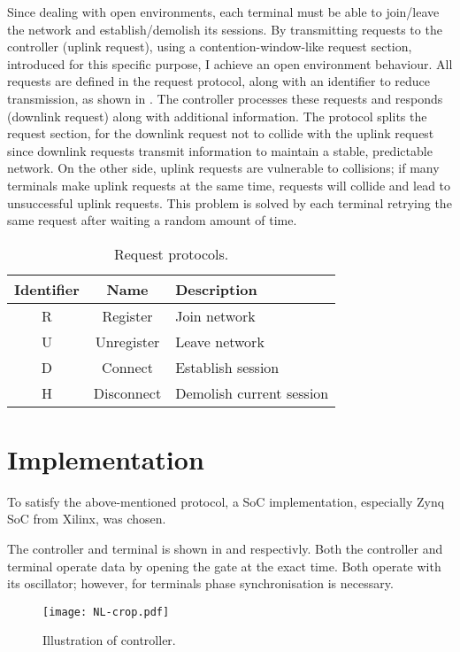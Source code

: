 ﻿\documentclass[twocolumn,9pt]{ltjsarticle}
\renewcommand{\ref}{\Cref}
\begin{document}
Since dealing with open environments, each terminal must be able to join/leave the network and establish/demolish its sessions.
By transmitting requests to the controller (uplink request), using a contention-window-like request section, introduced for this specific purpose, I achieve an open environment behaviour.
All requests are defined in the request protocol, along with an identifier to reduce transmission, as shown in \ref{tab:request}.
The controller processes these requests and responds (downlink request) along with additional information.
The protocol splits the request section, for the downlink request not to collide with the uplink request since downlink requests transmit information to maintain a stable, predictable network.
On the other side, uplink requests are vulnerable to collisions; if many terminals make uplink requests at the same time, requests will collide and lead to unsuccessful uplink requests.
This problem is solved by each terminal retrying the same request after waiting a random amount of time.
\begin{table}[tb]
  \centering
  \small
  \caption{\label{tab:request}
    Request protocols.
  }
  \begin{tabularx}{\linewidth}{ccl}
    \hline
    Identifier & Name & Description\\
    \hline \hline
    R & Register & Join network\\
    U & Unregister & Leave network\\
    D & Connect & Establish session\\
    H & Disconnect & Demolish current session\\
    \hline
  \end{tabularx}
\end{table}

\section{Implementation}
To satisfy the above-mentioned protocol, a SoC implementation, especially Zynq SoC from Xilinx\textregistered, was chosen.

The controller and terminal is shown in \ref{fig:controller} and \ref{fig:terminal} respectivly.
Both the controller and terminal operate data by opening the gate at the exact time.
Both operate with its oscillator; however, for terminals phase synchronisation is necessary.

\begin{figure}[tb]
  \centering
  \texttt{[image: NL-crop.pdf]}
  \caption{\label{fig:controller}
    Illustration of controller.
  }
\end{figure}
\end{document}

